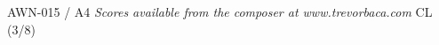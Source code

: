 \documentclass[11pt]{report}
\begin{document}
\null \vfill

AWN-015 / A4 \hfill
\textit{Scores available from the composer at www.trevorbaca.com}
\hfill CL (3/8)
\end{document}
